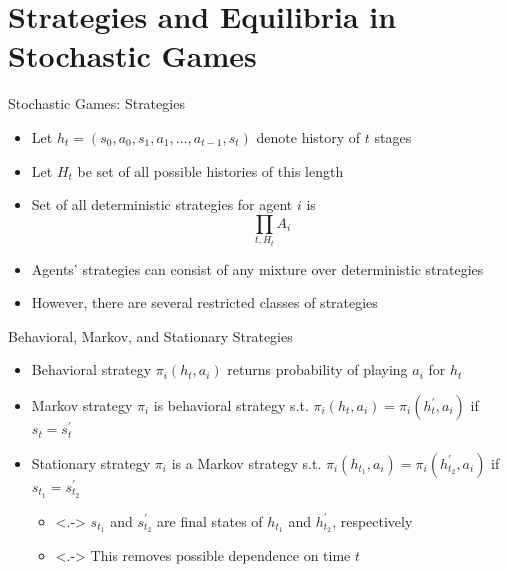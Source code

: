 \documentclass[11pt,aspectratio=169]{beamer}
\begin{document}
  
 \section{Strategies and Equilibria in Stochastic Games}
 
  \begin{frame}{Stochastic Games: Strategies}
   \begin{itemize}
    \item Let $h_t =(s_0, a_0, s_1, a_1, \dots, a_{t-1}, s_t)$ denote \alert{history} of $t$ stages
    \item Let $H_t$ be set of all possible histories of this length
    \item Set of all \alert{deterministic} strategies for agent $i$ is
    $$\prod_{t,H_t}A_i$$
    \item Agents' strategies can consist of any mixture over deterministic strategies
    \item However, there are several restricted classes of strategies
   \end{itemize}
  \end{frame}
  
  
  \begin{frame}{Behavioral, Markov, and Stationary Strategies}
   \begin{itemize}[<+->]
   \setlength{\itemsep}{1.2em}
    \item \alert{Behavioral} strategy $\pi_i(h_t, a_{i})$ returns probability of playing $a_i$ for $h_t$
    \item \alert{Markov} strategy $\pi_i$ is behavioral strategy s.t. $\pi_i(h_t,a_i) = \pi_i(h^\prime_t,a_i)$ if $s_t = s_t^\prime$
    \item \alert{Stationary} strategy $\pi_i$ is a Markov strategy s.t. $\pi_i(h_{t_1}, a_i) = \pi_i(h^\prime_{t_2}, a_i)$ if $s_{t_1} = s^\prime_{t_2}$
    \vspace{0.5em}
    \begin{itemize}
    \setlength{\itemsep}{0.5em}
     \item<.-> $s_{t_1}$ and $s^\prime_{t_2}$ are final states of $h_{t_1}$ and $h^\prime_{t_2}$, respectively
     \item<.-> This removes possible dependence on time $t$
    \end{itemize}
   \end{itemize}
  \end{frame}
  
\end{document}
